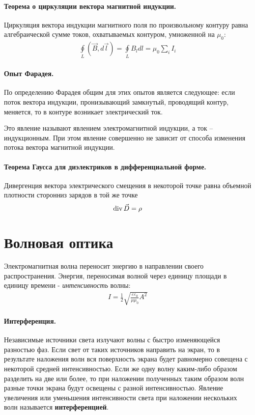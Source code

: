 \documentclass[12pt]{extarticle}
\begin{document}
\paragraph{Теорема о циркуляции вектора магнитной индукции.}
Циркуляция вектора индукции магнитного поля по произвольному контуру
равна алгебраической сумме токов, охватываемых контуром, умноженной на
$\mu_{0}$:
\begin{eqnarray*}
    \oint\limits_{L}(\vec{B},d\vec{l})
    =\oint\limits_{L}B_{l}dl=\mu_{0}\sum\limits_{i}I_{i}
\end{eqnarray*}

\paragraph{Опыт Фарадея.}
По определению Фарадея общим для этих опытов является следующее: если
поток вектора индукции, пронизывающий замкнутый, проводящий контур,
меняется, то в контуре возникает электрический ток.
\par Это явление называют явлением электромагнитной индукции, а ток –
индукционным. При этом явление совершенно не зависит от способа
изменения потока вектора магнитной индукции.

\paragraph{Теорема Гаусса для диэлектриков в дифференциальной форме.}
Дивергенция вектора электрического смещения в некоторой точке равна
объемной плотности сторонниз зарядов в той же точке
\begin{eqnarray*}
\textmd{div}\,\vec{D}=\rho
\end{eqnarray*}


\section{Волновая оптика}
Электромагнитная волна переносит энергию в направлении своего
распространения. Энергия, переносимая волной через единицу площади в
единицу времени - \textit{интенсивность} волны:
\begin{eqnarray*}
    I=\frac{1}{2}\sqrt{\frac{\varepsilon\varepsilon_{0}}{\mu\mu_{0}}A^{2}}
\end{eqnarray*}

\paragraph{Интерференция.}
Независимые источники света излучают волны с быстро изменяющейся
разностью фаз. Если свет от таких источников направить на экран, то в
результате наложения волн вся поверхность экрана будет равномерно
совещена с некоторой средней интенсивностью. Если же одну волну
каким-либо образом разделить на две или более, то при наложении
полученных таким образом волн разные точки экрана будут освещены с
разной интенсивностью. Явление увеличения или уменьшения интенсивности
света при наложении нескольких волн называется \textbf{интерференцией}.
\end{document}
